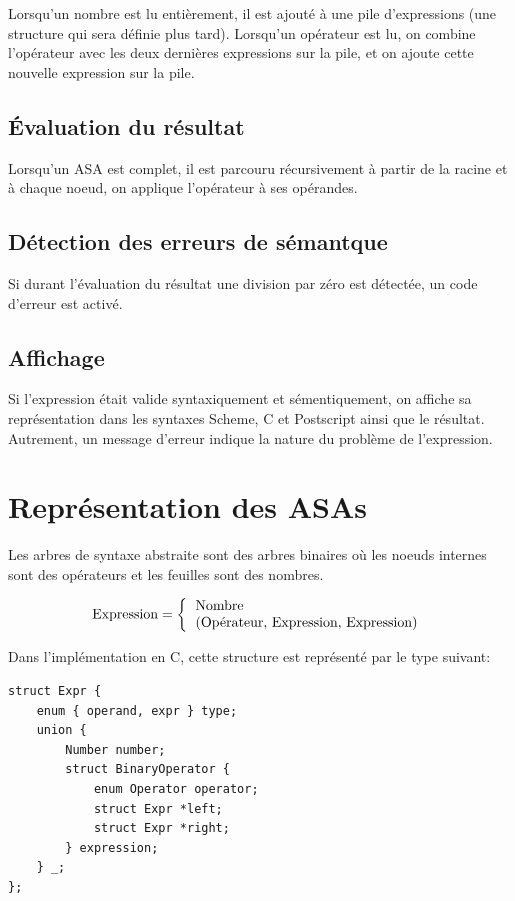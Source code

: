 \documentclass[10pt]{report}
\begin{document}
Lorsqu'un nombre est lu entièrement, il est ajouté à une pile
d'expressions (une structure qui sera définie plus tard).  Lorsqu'un
opérateur est lu, on combine l'opérateur avec les deux dernières
expressions sur la pile, et on ajoute cette nouvelle expression sur la
pile.

\subsection{Évaluation du résultat}

Lorsqu'un ASA est complet, il est parcouru récursivement à partir de
la racine et à chaque noeud, on applique l'opérateur à ses opérandes.

\subsection{Détection des erreurs de sémantque}

Si durant l'évaluation du résultat une division par zéro est détectée,
un code d'erreur est activé.

\subsection{Affichage}

Si l'expression était valide syntaxiquement et sémentiquement, on
affiche sa représentation dans les syntaxes Scheme, C et Postscript
ainsi que le résultat.  Autrement, un message d'erreur indique la
nature du problème de l'expression.


\section{Représentation des ASAs}

Les arbres de syntaxe abstraite sont des arbres binaires où les noeuds
internes sont des opérateurs et les feuilles sont des nombres.

\[
\text{Expression} =
\left\{
\begin{tabular}{l}
  \text{Nombre} \\
  \text{(Opérateur, Expression, Expression)}
\end{tabular}
\right.
\]

Dans l'implémentation en C, cette structure est représenté par le type
suivant:

\begin{verbatim}
struct Expr {
    enum { operand, expr } type;
    union {
        Number number;
        struct BinaryOperator {
            enum Operator operator;
            struct Expr *left;
            struct Expr *right;
        } expression;
    } _;
};
\end{verbatim}
\end{document}

